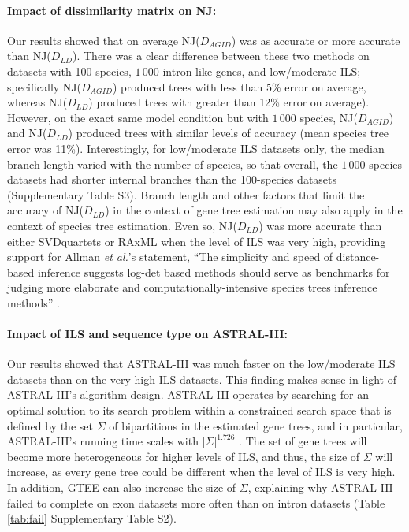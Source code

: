 \paragraph{Impact of dissimilarity matrix on NJ:}
Our results showed that on average NJ($D_{AGID}$) was as accurate or more accurate than NJ($D_{LD}$).
There was a clear difference between these two methods on datasets with 100 species, $1\,000$ intron-like genes, and low/moderate ILS; specifically NJ($D_{AGID}$) produced trees with less than 5\% error on average, whereas NJ($D_{LD}$) produced trees with greater than 12\% error on average).
However, on the exact same model condition but with $1\,000$ species, NJ($D_{AGID}$) and NJ($D_{LD}$) produced trees with similar levels of accuracy (mean species tree error was 11\%).
Interestingly, for low/moderate ILS datasets only, the median branch length varied with the number of species, so that overall, the $1\,000$-species datasets had shorter internal branches than the 100-species datasets (Supplementary Table S3).
Branch length and other factors that limit the accuracy of NJ($D_{LD}$) in the context of gene tree estimation may also apply in the context of species tree estimation.
Even so, NJ($D_{LD}$) was more accurate than either SVDquartets or RAxML when the level of ILS was very high, providing support for Allman {\em et al.}'s statement, ``The simplicity and speed of distance-based inference suggests log-det based methods should serve as benchmarks for judging more elaborate and computationally-intensive species trees inference methods'' \cite{allman2019species-logdet}.

\paragraph{Impact of ILS and sequence type on ASTRAL-III:}
Our results showed that ASTRAL-III was much faster on the low/moderate ILS datasets than on the very high ILS datasets.
This finding makes sense in light of ASTRAL-III's algorithm design.
ASTRAL-III operates by searching for an optimal solution to its search problem within a constrained search space that is defined by the set $\Sigma$ of bipartitions in the estimated gene trees, and in particular, ASTRAL-III's running time scales with $|\Sigma|^{1.726}$ \cite{zhang2018astral3}.
The set of gene trees will become more heterogeneous for higher levels of ILS, and thus, the size of $\Sigma$ will  increase, as every gene tree could be different when the level of ILS is very high.
In addition, GTEE can also increase the size of $\Sigma$, explaining why ASTRAL-III failed to complete on exon datasets more often than on intron datasets (Table \ref{tab:fail} Supplementary Table S2).

